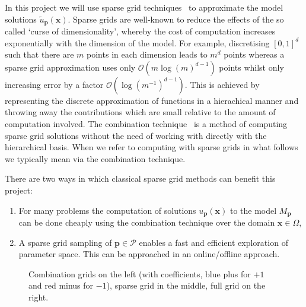 \documentclass[a4paper,fontsize=12pt]{scrartcl}
\begin{document}

In this project we will use sparse grid 
techniques~\cite{BungartzGriebel2004}  
to approximate the model solutions $\tilde{u}_{\mathbf{p}}(\mathbf{x})$.
Sparse grids are well-known to reduce the effects of the so called 
`curse of dimensionality', whereby the cost of computation increases 
exponentially with the dimension of the model. 
For example, discretising $[0,1]^{d}$ such that there are $m$ points in each dimension leads to $m^{d}$ points whereas a sparse grid approximation uses only $\mathcal{O}(m\log(m)^{d-1})$ points whilst only increasing error by a factor $\mathcal{O}(\log(m^{-1})^{d-1})$.
This is achieved by representing the discrete approximation of functions in a hierachical manner and throwing away the contributions which are small relative to the amount of computation involved.
The combination technique~\cite{Griebel1990} is a method of computing sparse grid solutions without the need of working with directly with the hierarchical basis.
When we refer to computing with sparse grids in what follows we typically mean via the combination technique.

There are two ways in which classical sparse grid methods can benefit this 
project:
\begin{enumerate}
\item For many problems the computation of solutions 
$u_{\mathbf{p}}(\mathbf{x})$ to the model $M_{\mathbf{p}}$ can be done 
cheaply using the combination technique over the domain $\mathbf{x}\in\Omega$,
\item A sparse grid sampling of $\mathbf{p}\in\mathcal{P}$ enables a fast 
and efficient exploration of parameter space. This can be approached in an online/offline approach.
\end{enumerate}

\begin{figure}[h!]
\centering

\caption{Combination grids on the left (with coefficients, blue plus for $+1$ and red minus for $-1$), sparse grid in the middle, full grid on the right.}
\end{figure}
\end{document}
